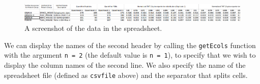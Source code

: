 \begin{figure}[!ht]
  \centering
  \includegraphics[width=.85\textwidth]{./Figures/spreadsheet-screenshot.png}
  \caption{A screenshot of the data in the spreadsheet.}
  \label{fig:spreadsheet}
\end{figure}


We can display the names of the second header by calling the
\texttt{getEcols} function with the argument \texttt{n = 2} (the
default value is \texttt{n = 1}), to specify that we wish to display
the column names of the second line. We also specify the name of the
spreadsheet file (defined as \texttt{csvfile} above) and the
separator that splits cells.

